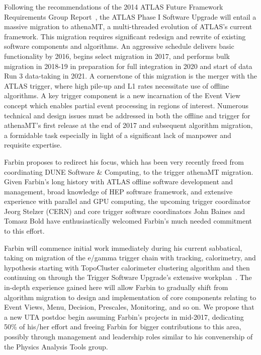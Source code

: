 
Following the recommendations of the 2014 ATLAS Future Framework
Requirements Group Report~\cite{}, the ATLAS Phase I Software Upgrade
will entail a massive migration to athenaMT, a multi-threaded
evolution of ATLAS's current framework. This migration requires
significant redesign and rewrite of existing software components and
algorithms. An aggressive schedule delivers basic functionality by
2016, begins select migration in 2017, and performs bulk migration in
2018-19 in preparation for full integration in 2020 and start of data
Run 3 data-taking in 2021. A cornerstone of this migration is the
merger with the ATLAS trigger, where high pile-up and L1 rates
necessitate use of offline algorithms. A key trigger component is a
new incarnation of the Event View concept which enables partial event
processing in regions of interest. Numerous technical and design
issues must be addressed in both the offline and trigger for
athenaMT's first release at the end of 2017 and subsequent algorithm
migration, a formidable task especially in light of a significant lack
of manpower and requisite expertise.


Farbin proposes to redirect his focus, which has been very recently
freed from coordinating DUNE Software \& Computing, to the trigger
athenaMT migration. Given Farbin's long history with ATLAS offline
software development and management, broad knowledge of HEP software
framework, and extensive experience with parallel and GPU computing,
the upcoming trigger coordinator Jeorg Stelzer (CERN) and core trigger
software coordinators John Baines and Tomasz Bold have
enthusiastically welcomed Farbin's much needed commitment to this
effort. 

Farbin will commence initial work immediately during his current
sabbatical, taking on migration of the e/gamma trigger chain with
tracking, calorimetry, and hypothesis starting with TopoCluster
calorimeter clustering algorithm and then continuing on through the
Trigger Software Upgrade's extensive workplan~\cite{}. The in-depth
experience gained here will allow Farbin to gradually shift from
algorithm migration to design and implementation of core components
relating to Event Views, Menu, Decision, Prescales, Monitoring, and so
on.  We propose that a new UTA postdoc begin assuming Farbin's
projects in mid-2017, dedicating 50\% of his/her effort and freeing
Farbin for bigger contributions to this area, possibly through
management and leadership roles similar to his convenership of the
Physics Analysis Tools group.

